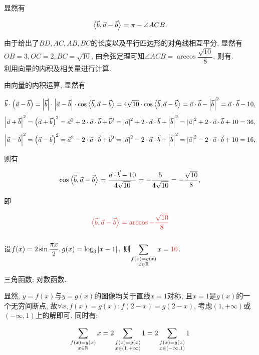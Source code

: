 \documentclass[8pt]{article}
\begin{document}
		显然有

		\[
		\left\langle{\vec{b}, \vec{a} - \vec{b}}\right\rangle = \pi - \angle ACB.
		\]

		由于给出了\(BD, AC, AB, BC\)的长度以及平行四边形的对角线相互平分, 显然有\(OB=3, OC=2, BC=\sqrt{10}\), 由余弦定理可知\(\angle ACB = \arccos{\dfrac{\sqrt{10}}{8}}\), 则有.
		~\\

		利用向量的内积及相关量进行计算.

		由向量的内积运算, 显然有

		\[
		\vec{b} \cdot \left(\vec{a} - \vec{b}\right) = \left\lvert \vec{b} \right\rvert \cdot \left\lvert \vec{a} - \vec{b} \right\rvert \cdot \cos \left\langle{\vec{b}, \vec{a} - \vec{b}}\right\rangle = 4\sqrt{10} \cdot \cos \left\langle{\vec{b}, \vec{a} - \vec{b}}\right\rangle = \vec{a}\cdot\vec{b} - \left\lvert \vec{b} \right\rvert^2 = \vec{a}\cdot\vec{b} - 10,
		\]
		\[
		\left\lvert \vec{a} + \vec{b} \right\rvert^2 = \left(\vec{a} + \vec{b}\right)^2 = \vec{a}^2 + 2 \cdot \vec{a} \cdot \vec{b} + \vec{b}^2 = \left\lvert \vec{a} \right\rvert^2 + 2 \cdot \vec{a} \cdot \vec{b} + \left\lvert \vec{b} \right\rvert^2 =  \left\lvert \vec{a} \right\rvert^2 + 2 \cdot \vec{a} \cdot \vec{b} + 10 = 36,
		\]
		\[
		\left\lvert \vec{a} - \vec{b} \right\rvert^2 = \left(\vec{a} - \vec{b}\right)^2 = \vec{a}^2 - 2 \cdot \vec{a} \cdot \vec{b} + \vec{b}^2 = \left\lvert \vec{a} \right\rvert^2 - 2 \cdot \vec{a} \cdot \vec{b} + \left\lvert \vec{b} \right\rvert^2 = \left\lvert \vec{a} \right\rvert^2 - 2 \cdot \vec{a} \cdot \vec{b} + 10 = 16,
		\]

		则有

		\[
		\cos \left\langle{\vec{b}, \vec{a} - \vec{b}}\right\rangle = \frac{\vec{a} \cdot \vec{b} - 10}{4 \sqrt{10}} = - \frac{5}{4 \sqrt{10}} = - \frac{\sqrt{10}}{8},
		\]

		即

		\[
		\ansmath{\ang{\vec{b}, \vec{a} - \vec{b}} = \arccos{-\dfrac{\sqrt{10}}{8}}}
		\]
		~\\

		设\(f(x)=2\sin\dfrac{\pi x}{2}, g(x)=\log_{3}\left\lvert x-1 \right\rvert,\) 则\(\displaystyle \sum_{\substack {f(x)=g(x)\\ x\in\RR\\}}x=\ansmath{10}\).

		三角函数; 对数函数.

		显然, \(y=f(x)\)与\(y=g(x)\)的图像均关于直线\(x=1\)对称, 且\(x=1\)是\(g(x)\)的一个无穷间断点, 故\(\forall x, f(x) = g(x): f(2-x) = g(2-x)\), 考虑\((1, +\infty)\)或\((-\infty, 1)\)上的解即可. 同时有:

		\[
			\sum_{\substack {f(x)=g(x)\\ x\in\mathbb{R}\\}}x = 2\sum_{\substack {f(x)=g(x)\\ x\in (1, +\infty)}}1 = 2\sum_{\substack {f(x)=g(x)\\ x\in (-\infty, 1)}}1
		\]
\end{document}
